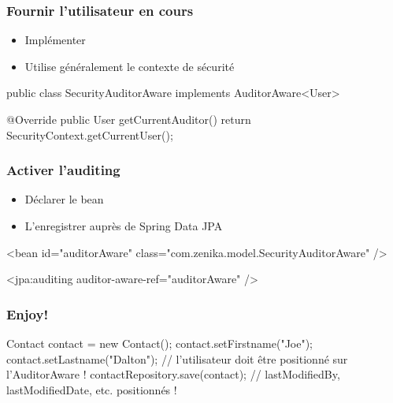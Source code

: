 \begin{frame}[fragile]
 \frametitle{Fournir l'utilisateur en cours}

 \begin{itemize}
  \item Implémenter 
  \item Utilise généralement le contexte de sécurité
 \end{itemize}

 \begin{javacode}
public class SecurityAuditorAware implements AuditorAware<User> {

  @Override
  public User getCurrentAuditor() {
    return SecurityContext.getCurrentUser();
  }

}
 \end{javacode}
\end{frame}

\begin{frame}[fragile]
 \frametitle{Activer l'auditing}

 \begin{itemize}
  \item Déclarer le bean 
  \item L'enregistrer auprès de Spring Data JPA
 \end{itemize}

 \begin{xmlcode}
<bean id="auditorAware" 
      class="com.zenika.model.SecurityAuditorAware" />

<jpa:auditing auditor-aware-ref="auditorAware" />
 \end{xmlcode}
\end{frame}

\begin{frame}[fragile]
 \frametitle{Enjoy!}

 \begin{javacode}
Contact contact = new Contact();
contact.setFirstname("Joe");
contact.setLastname("Dalton");
// l'utilisateur doit \^etre positionn\'e sur l'AuditorAware !
contactRepository.save(contact);
// lastModifiedBy, lastModifiedDate, etc. positionn\'es !
 \end{javacode}
\end{frame}